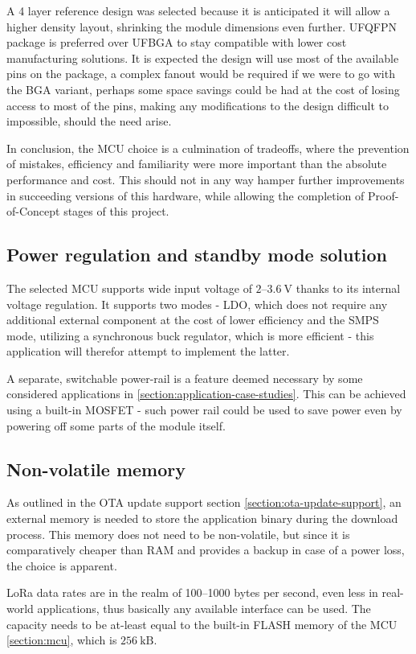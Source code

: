A 4 layer reference design was selected because it is anticipated it will allow a higher density layout, shrinking the module dimensions even further. UFQFPN package is preferred over UFBGA to stay compatible with lower cost manufacturing solutions. It is expected the design will use most of the available pins on the package, a complex fanout would be required if we were to go with the BGA variant, perhaps some space savings could be had at the cost of losing access to most of the pins, making any modifications to the design difficult to impossible, should the need arise.

In conclusion, the MCU choice is a culmination of tradeoffs, where the prevention of mistakes, efficiency and familiarity were more important than the absolute performance and cost. This should not in any way hamper further improvements in succeeding versions of this hardware, while allowing the completion of Proof-of-Concept stages of this project. 

\subsection{Power regulation and standby mode solution}
The selected MCU supports wide input voltage of $2\text{--}3.6~\mathrm{V}$ thanks to its internal voltage regulation. It supports two modes - LDO, which does not require any additional external component at the cost of lower efficiency and the SMPS mode, utilizing a synchronous buck regulator, which is more efficient - this application will therefor attempt to implement the latter.

A separate, switchable power-rail is a feature deemed necessary by some considered applications in \ref{section:application-case-studies}. This can be achieved using a built-in MOSFET - such power rail could be used to save power even by powering off some parts of the module itself.

\subsection{Non-volatile memory}
As outlined in the OTA update support section \ref{section:ota-update-support}, an external memory is needed to store the application binary during the download process. This memory does not need to be non-volatile, but since it is comparatively cheaper than RAM and provides a backup in case of a power loss, the choice is apparent.

LoRa data rates are in the realm of 100--1000 bytes per second, even less in real-world applications, thus basically any available interface can be used. The capacity needs to be at-least equal to the built-in FLASH memory of the MCU \ref{section:mcu}, which is $256~\mathrm{kB}$.

